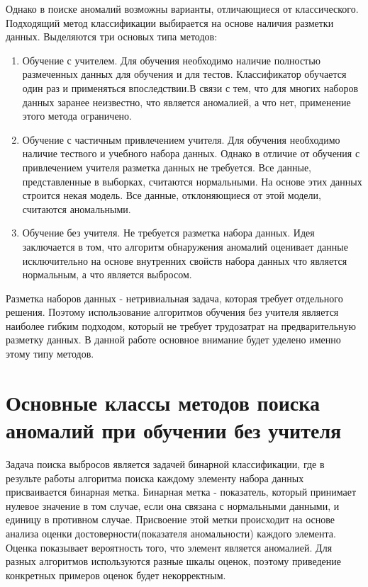 Однако в поиске аномалий возможны варианты, отличающиеся от классического. Подходящий метод классификации выбирается на основе наличия разметки данных.   Выделяются три основых типа методов:
\begin{enumerate}
	\item Обучение с учителем. Для обучения необходимо наличие полностью  размеченных данных для обучения и для тестов. Классификатор  обучается один раз и применяться впоследствии.В связи с тем, что для многих наборов данных заранее неизвестно, что является аномалией, а что нет, применение этого метода ограничено.
	\item Обучение с частичным привлечением учителя. Для обучения необходимо наличие тествого и учебного набора данных. Однако в отличие от обучения с привлечением учителя разметка данных не требуется. Все данные, представленные в выборках, считаются нормальными. На основе этих данных строится некая модель. Все данные, отклоняющиеся от этой модели, считаются аномальными.
	\item Обучение без учителя.
	Не требуется разметка набора данных.  Идея заключается в том, что алгоритм обнаружения аномалий оценивает данные исключительно на основе внутренних свойств набора данных что является нормальным, а что является выбросом. 
\end{enumerate}
Разметка наборов данных - нетривиальная задача, которая требует отдельного решения. Поэтому использование алгоритмов обучения без учителя является наиболее гибким подходом, который не требует трудозатрат на предварительную разметку данных. В данной работе основное внимание будет уделено именно этому типу методов.

\section{Основные классы методов поиска аномалий при обучении без учителя}
Задача поиска выбросов является задачей бинарной классификации, где в результе работы алгоритма поиска каждому элементу набора данных присваивается бинарная метка. Бинарная метка - показатель, который принимает нулевое значение в том случае, если она связана с нормальными данными, и единицу в противном случае. Присвоение этой метки происходит на основе анализа оценки достоверности(показателя аномальности) каждого элемента. Оценка показывает вероятность того, что элемент является аномалией. Для разных алгоритмов используются разные шкалы оценок, поэтому приведение конкретных примеров оценок будет некорректным.


